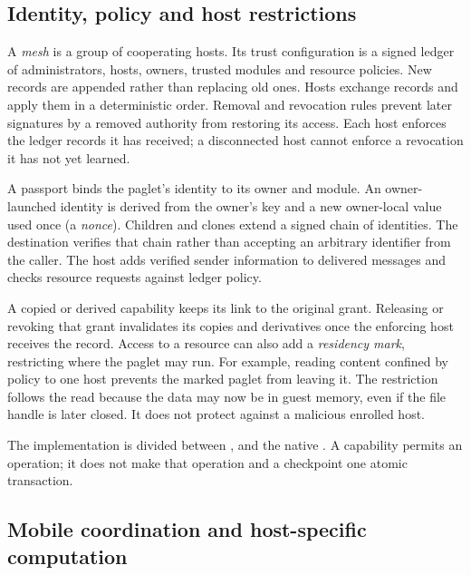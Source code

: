 
\subsection{Identity, policy and host restrictions}\label{sec:mesh-policy}

A \emph{mesh} is a group of cooperating hosts. Its trust configuration is
a signed ledger of administrators, hosts, owners, trusted modules and
resource policies. New records are appended rather than replacing old
ones. Hosts exchange records and apply them in a deterministic order.
Removal and revocation rules prevent later signatures by a removed
authority from restoring its access. Each host enforces the ledger
records it has received; a disconnected host cannot enforce a revocation
it has not yet learned.

A passport binds the paglet's identity to its owner and module.
An owner-launched identity is derived from the owner's key and a new
owner-local value used once (a \emph{nonce}). Children and clones extend
a signed chain of identities. The destination verifies that chain rather
than accepting an arbitrary identifier from the caller. The host adds
verified sender information to delivered messages and checks resource
requests against ledger policy.

A copied or derived capability keeps its link to the original grant.
Releasing or revoking that grant invalidates its copies and derivatives
once the enforcing host receives the record. Access to a resource can
also add a \emph{residency mark}, restricting where the paglet may run.
For example, reading content confined by policy to one host prevents
the marked paglet from leaving it. The restriction follows the read
because the data may now be in guest memory, even if the file handle is
later closed. It does not protect against a malicious enrolled host.

The implementation is divided between
,
 and the native
. A capability
permits an operation; it does not make that operation and a checkpoint
one atomic transaction.

\subsection{Mobile coordination and host-specific computation}\label{sec:mesh-compute}

